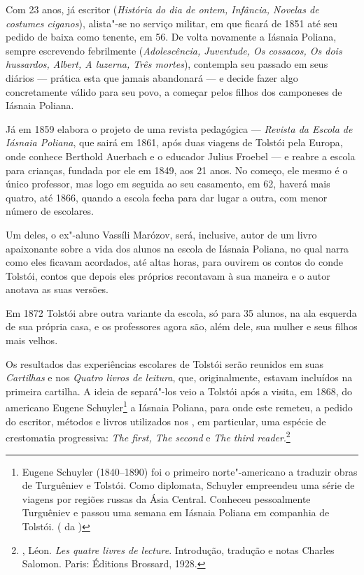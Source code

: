 Com 23 anos, já escritor (\emph{História do dia de ontem,
Infância, Novelas de costumes ciganos}), alista"-se no serviço
militar, em que ficará de 1851 até seu pedido de baixa como
tenente, em 56. De volta novamente a Iásnaia Poliana, sempre
escrevendo febrilmente (\emph{Adolescência, Juventude, Os
cossacos, Os dois hussardos, Albert, A luzerna, Três mortes}),
contempla seu passado em seus diários --- prática esta que jamais
abandonará --- e decide fazer algo concretamente válido para seu
povo, a começar pelos filhos dos camponeses de Iásnaia Poliana.

Já em 1859 elabora o projeto de uma revista pedagógica ---
\emph{Revista da Escola de Iásnaia Poliana}, que sairá
em 1861, após duas viagens de Tolstói pela Europa, onde
conhece Berthold Auerbach e o educador Julius Froebel ---
e reabre a escola para crianças, fundada por ele em 1849,
aos 21 anos. No começo, ele mesmo é o único professor, mas
logo em seguida ao seu casamento, em 62, haverá mais quatro,
até 1866, quando a escola fecha para dar lugar a outra, com
menor número de escolares.

Um deles, o ex"-aluno Vassíli Marózov, será, inclusive, autor de
um livro apaixonante sobre a vida dos alunos na escola de Iásnaia
Poliana, no qual narra como eles ficavam acordados, até altas
horas, para ouvirem os contos do conde Tolstói, contos que depois eles
próprios recontavam à sua maneira e o autor anotava as suas
versões.

Em 1872 Tolstói abre outra variante da escola, só para 35 alunos,
na ala esquerda de sua própria casa, e os professores agora são,
além dele, sua mulher e seus filhos mais velhos.

Os resultados das experiências escolares de Tolstói serão
reunidos em suas \emph{Cartilhas} e nos \emph{Quatro livros
de leitura}, que, originalmente, estavam incluídos na primeira
cartilha. A ideia de separá"-los veio a Tolstói após a visita,
em 1868, do americano Eugene Schuyler\footnote{Eugene Schuyler
(1840--1890) foi o primeiro norte"-americano a traduzir obras de
Turguêniev e Tolstói. Como diplomata, Schuyler empreendeu uma
série de viagens por regiões russas da Ásia Central. Conheceu
pessoalmente Turguêniev e passou uma semana em Iásnaia Poliana
em companhia de Tolstói. ( da )} a Iásnaia Poliana,
para onde este remeteu, a pedido do escritor, métodos e livros
utilizados nos , em particular, uma espécie de
crestomatia progressiva: \emph{The first, The second} e \emph{The third
reader}.\footnote{, Léon. \emph{Les quatre livres de
lecture}. Introdução, tradução e notas Charles Salomon. Paris:
Éditions Brossard, 1928.}

